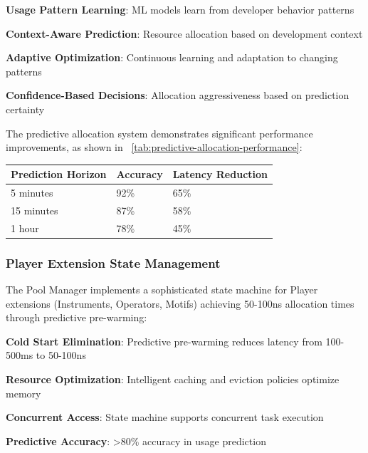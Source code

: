 \begin{expandedlist}
    \item \textbf{Usage Pattern Learning}: ML models learn from developer behavior patterns
    \item \textbf{Context-Aware Prediction}: Resource allocation based on development context
    \item \textbf{Adaptive Optimization}: Continuous learning and adaptation to changing patterns
    \item \textbf{Confidence-Based Decisions}: Allocation aggressiveness based on prediction certainty
\end{expandedlist}

The predictive allocation system demonstrates significant performance improvements, as shown in ~\ref{tab:predictive-allocation-performance}:

\begin{center}
\begin{tabular}{@{}lll@{}}
\toprule
\textbf{Prediction Horizon} & \textbf{Accuracy} & \textbf{Latency Reduction} \\
\midrule
5 minutes & 92\% & 65\% \\
15 minutes & 87\% & 58\% \\
1 hour & 78\% & 45\% \\
\bottomrule
\end{tabular}
\label{tab:predictive-allocation-performance}
\end{center}

\subsubsection*{Player Extension State Management}

The Pool Manager implements a sophisticated state machine for Player extensions (Instruments, Operators, Motifs) achieving 50-100ns allocation times through predictive pre-warming:

\begin{compactlist}
    \item \textbf{Cold Start Elimination}: Predictive pre-warming reduces latency from 100-500ms to 50-100ns
    \item \textbf{Resource Optimization}: Intelligent caching and eviction policies optimize memory
    \item \textbf{Concurrent Access}: State machine supports concurrent task execution
    \item \textbf{Predictive Accuracy}: >80\% accuracy in usage prediction
\end{compactlist}

